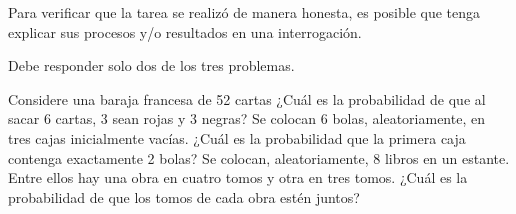 \documentclass[]{srs}
\begin{document}
  Para verificar que la tarea se realizó de manera honesta, es posible que tenga
  explicar sus procesos y/o resultados en una interrogación.

\newpage

\begin{aviso}[after skip=4em]
  Debe responder solo dos de los tres problemas.
\end{aviso}

\begin{preguntas}[after-item-skip=20pt]
  \pregunta Considere una baraja francesa de 52 cartas ¿Cuál es la probabilidad de que
  al sacar 6 cartas, 3 sean rojas y 3 negras?
  \pregunta Se colocan 6 bolas, aleatoriamente, en tres cajas inicialmente vacías.
  ¿Cuál es la probabilidad que la primera caja contenga exactamente 2 bolas?
  \pregunta Se colocan, aleatoriamente, 8 libros en un estante. Entre ellos hay
  una obra en cuatro tomos y otra en tres tomos. ¿Cuál es la probabilidad de que los tomos
  de cada obra estén juntos?

\end{preguntas}
\end{document}
